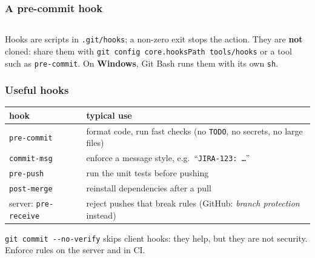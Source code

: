 \documentclass[aspectratio=169,10pt,compress]{beamer}
\newcommand{\win}{\textbf{Windows}}
\begin{document}
\begin{frame}[t,fragile] \frametitle{A pre-commit hook}
  \begin{columns}[T]
    \begin{column}{0.49\textwidth}
    \end{column}
    \begin{column}{0.49\textwidth}
    \end{column}
  \end{columns}

  \vspace{0.1em}
  \small
  Hooks are scripts in \texttt{.git/hooks}; a non-zero exit stops the action. They are \textbf{not} cloned: share them with
  \texttt{git config core.hooksPath tools/hooks} or a tool such as \texttt{pre-commit}. On \win, Git Bash runs them with its own \texttt{sh}.
\end{frame}




\begin{frame}[t,fragile] \frametitle{Useful hooks}
  \begin{center}\small
  \begin{tabular}{lL{0.6\textwidth}}
    \toprule
    \textbf{hook}         & \textbf{typical use} \\
    \midrule
    \texttt{pre-commit}   & format code, run fast checks (no \texttt{TODO}, no secrets, no large files) \\
    \texttt{commit-msg}   & enforce a message style, e.g.\ ``\texttt{JIRA-123: \dots}'' \\
    \texttt{pre-push}     & run the unit tests before pushing \\
    \texttt{post-merge}   & reinstall dependencies after a pull \\
    server: \texttt{pre-receive} & reject pushes that break rules (GitHub: \emph{branch protection} instead) \\
    \bottomrule
  \end{tabular}
  \end{center}
  \small \texttt{git commit -{}-no-verify} skips client hooks: they help, but they are not security. Enforce rules on the server and in CI.
\end{frame}
\end{document}
